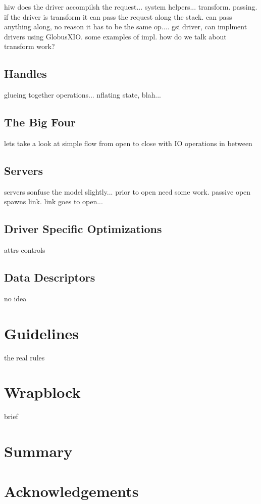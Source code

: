 \documentclass[11pt]{article}
\begin{document}
hiw does the driver accompilsh the request... system helpers... transform.
passing.  if the driver is transform it can pass the request along the stack.
can pass anything along, no reason it has to be the same op.... gsi driver,
can implment drivers using GlobusXIO.  some examples of impl.  
how do we talk about transform work?

\subsection{Handles}
glueing together operations... nflating state, blah...

\subsection{The Big Four}
lets take a look at simple flow from open to close with IO operations in
between

\subsection{Servers}
servers sonfuse the model slightly... prior to open need some work.  passive
open spawns link.  link goes to open...

\subsection{Driver Specific Optimizations}
attrs
controls

\subsection{Data Descriptors}
no idea

\section{Guidelines}
the real rules

\section{Wrapblock}
brief

\section{Summary}

\section*{Acknowledgements}
\end{document}
